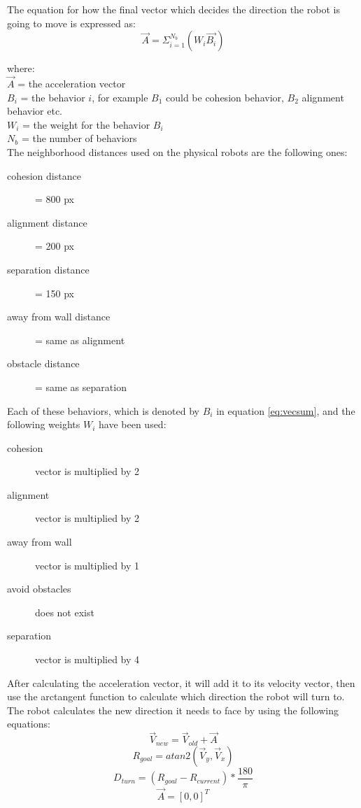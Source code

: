 The equation for how the final vector which decides the direction the robot is going to move is expressed as:
\begin{equation}
\label{eq:vecsum}
\vec{A} = \Sigma_{i=1}^{N_b}(W_i\vec{B_i})
\end{equation}

where:
\\
$\vec{A}$ = the acceleration vector
\\
$B_i$ = the behavior $i$, for example $B_1$ could be cohesion behavior, $B_2$ alignment behavior etc.
\\
$W_i$ = the weight for the behavior $B_i$\\
$N_b$ = the number of behaviors\\

The neighborhood distances used on the physical robots are the following ones:
\begin{description}
\item[cohesion distance] = 800 px
\item[alignment distance] = 200 px
\item[separation distance] = 150 px
\item[away from wall distance] = same as alignment
\item[obstacle distance] = same as separation
\end{description}

Each of these behaviors, which is denoted by $B_i$ in equation \ref{eq:vecsum}, and the following weights $W_i$ have been used:
\begin{description}
\item[cohesion] vector is multiplied by 2
\item[alignment] vector is multiplied by 2
\item[away from wall] vector is multiplied by 1
\item[avoid obstacles] does not exist
\item[separation] vector is multiplied by 4
\end{description}

After calculating the acceleration vector, it will add it to its velocity vector, then use the arctangent function to calculate which direction the robot will turn to. The robot calculates the new direction it needs to face by using the following equations:
\begin{equation}
\label{eq:veladdacc}
\vec{V}_{new} = \vec{V}_{old} + \vec{A}
\end{equation}
\begin{equation}
\label{eq:atan2}
R_{goal} = atan2(\vec{V}_y, \vec{V}_x)
\end{equation}
\begin{equation}
\label{eq:angletoturn}
D_{turn} = (R_{goal} - R_{current})* \frac{180}{\pi}
\end{equation}
\begin{equation}
\label{eq:accelreset}
\vec{A} = [0,0]^T
\end{equation}

